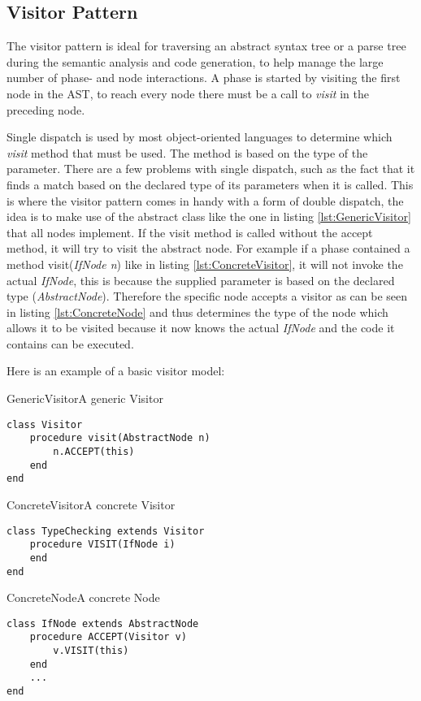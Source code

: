 \subsection{Visitor Pattern}
\label{sec:VisitorPattern}
The visitor pattern is ideal for traversing an abstract syntax tree or a parse tree during the semantic analysis and code generation, to help manage the large number of phase- and node interactions. A phase is started by visiting the first node in the AST, to reach every node there must be a call to \emph{visit} in the preceding node.

Single dispatch is used by most object-oriented languages to determine which \emph{visit} method that must be used. The method is based on the type of the parameter. There are a few problems with single dispatch, such as the fact that it finds a match based on the declared type of its parameters when it is called. This is where the visitor pattern comes in handy with a form of double dispatch, the idea is to make use of the abstract class like the one in listing \ref{lst:GenericVisitor} that all nodes implement. If the visit method is called without the accept method, it will try to visit the abstract node. For example if a phase contained a method visit(\textit{IfNode n}) like in listing \ref{lst:ConcreteVisitor}, it will not invoke the actual \textit{IfNode}, this is because the supplied parameter is based on the declared type (\textit{AbstractNode}). Therefore the specific node accepts a visitor as can be seen in listing \ref{lst:ConcreteNode} and thus determines the type of the node which allows it to be visited because it now knows the actual \textit{IfNode} and the code it contains can be executed.

Here is an example of a basic visitor model:

\begin{code}{GenericVisitor}{A generic Visitor}
\begin{lstlisting}
class Visitor
	procedure visit(AbstractNode n)
		n.ACCEPT(this)
	end
end
\end{lstlisting}
\end{code}

\begin{code}{ConcreteVisitor}{A concrete Visitor}
\begin{lstlisting}
class TypeChecking extends Visitor
	procedure VISIT(IfNode i)
	end
end
\end{lstlisting}
\end{code}

\begin{code}{ConcreteNode}{A concrete Node}
\begin{lstlisting}
class IfNode extends AbstractNode
	procedure ACCEPT(Visitor v)
		v.VISIT(this)
	end
	...
end
\end{lstlisting}
\end{code}